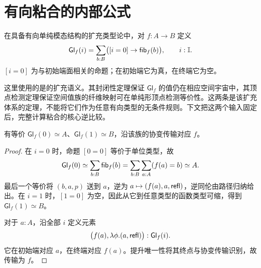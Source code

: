 \section{有向粘合的内部公式}
\begin{definition}[粘合族]
在具备有向单纯模态结构的扩充类型论中，对 $f:A\to B$ 定义
\[
\mathsf{Gl}_f(i)
=\sum_{b:B}\bigl([i=0]\to\mathsf{fib}_f(b)\bigr),
\qquad i:\mathbb I.
\]
$[i=0]$ 为与初始端面相关的命题；在初始端它为真，在终端它为空。
\end{definition}
\begin{remark}
这里使用的是\cite{GratzerWeinbergerBuchholtz}的扩充语义。其封闭性定理保证 $\mathsf{Gl}_f$ 的值仍在相应空间宇宙中，其顶点检测定理保证空间值族的纤维映射可在单纯形顶点检测等价性。这两条是该扩充体系的定理，不能将它们作为任意有向类型的无条件规则。下文把这两个输入固定后，完整计算粘合的核心逆比较。
\end{remark}
\begin{proposition}[粘合的端点]
有等价 $\mathsf{Gl}_f(0)\simeq A$、$\mathsf{Gl}_f(1)\simeq B$，沿该族的协变传输对应 $f$。
\end{proposition}
\begin{proof}
在 $i=0$ 时，命题 $[0=0]$ 等价于单位类型，故
\[
\mathsf{Gl}_f(0)
\simeq\sum_{b:B}\mathsf{fib}_f(b)
=\sum_{b:B}\sum_{a:A}(f(a)=b)
\simeq A.
\]
最后一个等价将 $(b,a,p)$ 送到 $a$，逆为 $a\mapsto(f(a),a,\mathsf{refl})$，逆同伦由路径归纳给出。在 $i=1$ 时，$[1=0]$ 为空，因此从它到任意类型的函数类型可缩，得到 $\mathsf{Gl}_f(1)\simeq B$。

对于 $a:A$，沿全部 $i$ 定义元素
\[
\bigl(f(a),\lambda\phi.(a,\mathsf{refl})\bigr):\mathsf{Gl}_f(i).
\]
它在初始端对应 $a$，在终端对应 $f(a)$。提升唯一性将其终点与协变传输识别，故传输为 $f$。
\end{proof}

